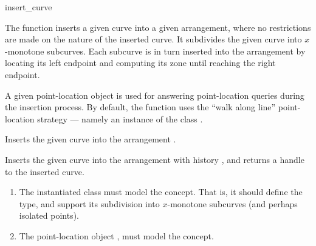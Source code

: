 \ccRefPageBegin

\begin{ccRefFunction}{insert_curve}

\ccDefinition

The function \ccRefName{} inserts a given curve into a given arrangement,
where no restrictions are made on the nature of the inserted curve.
It subdivides the given curve into $x$-monotone subcurves. Each subcurve
is in turn inserted into the arrangement by locating its left endpoint
and computing its zone until reaching the right endpoint.

A given point-location object is used for answering point-location queries
during the insertion process. By default, the function uses the
``walk along line'' point-location strategy --- namely an instance of the
class .



Inserts the given curve  into the arrangement .




Inserts the given curve  into the arrangement with history
, and returns a handle to the inserted curve.

\ccRequirements
\begin{enumerate}
\item The instantiated  class must model the
   concept. That is, it should define the
   type, and support its subdivision into $x$-monotone
  subcurves (and perhaps isolated points).
\item The point-location object , must model the
   concept.
\end{enumerate}

\end{ccRefFunction}

\ccRefPageEnd
